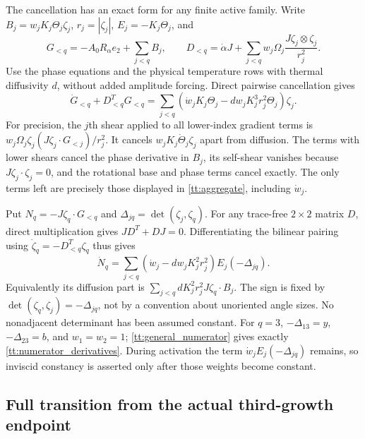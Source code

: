 The cancellation has an exact form for any finite active family.
Write $B_j=w_jK_j\Theta_j\zeta_j$, $r_j=|\zeta_j|$,
$E_j=-K_j\Theta_j$, and
\[
 G_{<q}=-A_0R_\alpha e_2+\sum_{j<q}B_j,\qquad
 D_{<q}=\dot\alpha J+
      \sum_{j<q}w_j\Omega_j\frac{J\zeta_j\otimes\zeta_j}{r_j^2}.
\]
Use the phase equations and the physical temperature rows with
thermal diffusivity $d$, without added amplitude forcing. Direct
pairwise cancellation gives
\begin{equation}\label{tt:aggregate}
 \dot G_{<q}+D_{<q}^TG_{<q}
 =\sum_{j<q}(\dot w_jK_j\Theta_j
                  -dw_jK_j^3r_j^2\Theta_j)\zeta_j.
\end{equation}
For precision, the $j$th shear applied to all lower-index gradient
terms is
$w_j\Omega_j\zeta_j(J\zeta_j\cdot G_{<j})/r_j^2$.
It cancels $w_jK_j\dot\Theta_j\zeta_j$ apart from diffusion.
The terms with lower shears cancel the phase derivative in $B_j$,
its self-shear vanishes because $J\zeta_j\cdot\zeta_j=0$,
and the rotational base and phase terms cancel exactly.
The only terms left are precisely those displayed in
\eqref{tt:aggregate}, including $\dot w_j$.

Put $N_q=-J\zeta_q\cdot G_{<q}$ and
$\Delta_{jq}=\det(\zeta_j,\zeta_q)$.
For any trace-free $2\times2$ matrix $D$, direct multiplication gives
$JD^T+DJ=0$. Differentiating the bilinear pairing using
$\dot\zeta_q=-D_{<q}^T\zeta_q$ thus gives
\begin{equation}\label{tt:general_numerator}
 \dot N_q=
 \sum_{j<q}(\dot w_j-dw_jK_j^2r_j^2)
               E_j(-\Delta_{jq}).
\end{equation}
Equivalently its diffusion part is
$\sum_{j<q}dK_j^2r_j^2J\zeta_q\cdot B_j$.
The sign is fixed by $\det(\zeta_q,\zeta_j)=-\Delta_{jq}$,
not by a convention about unoriented angle sizes.
No nonadjacent determinant has been assumed constant.
For $q=3$, $-\Delta_{13}=y$, $-\Delta_{23}=b$, and $w_1=w_2=1$;
\eqref{tt:general_numerator} gives exactly
\eqref{tt:numerator_derivatives}. During activation the term
$\dot w_j E_j(-\Delta_{jq})$ remains, so inviscid constancy is
asserted only after those weights become constant.

\subsection{Full transition from the actual third-growth endpoint}

